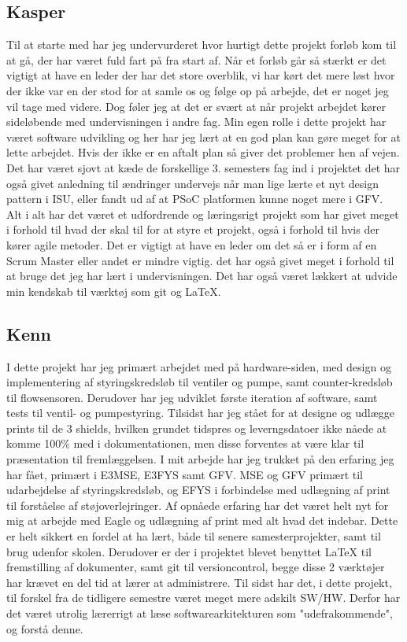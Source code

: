 \subsection{Kasper}
Til at starte med har jeg undervurderet hvor hurtigt dette projekt forløb kom til at gå, der har været fuld fart på fra start af. Når et forløb går så stærkt er det vigtigt at have en leder der har det store overblik, vi har kørt det mere løst hvor der ikke var en der stod for at samle os og følge op på arbejde, det er noget jeg vil tage med videre. Dog føler jeg at det er svært at når projekt arbejdet kører sideløbende med undervisningen i andre fag. Min egen rolle i dette projekt har været software udvikling og her har jeg lært at en god plan kan gøre meget for at lette arbejdet. Hvis der ikke er en aftalt plan så giver det problemer hen af vejen. Det har været sjovt at kæde de forskellige 3. semesters fag ind i projektet det har også givet anledning til ændringer undervejs når man lige lærte et nyt design pattern i ISU, eller fandt ud af at PSoC platformen kunne noget mere i GFV. \\
Alt i alt har det været et udfordrende og læringsrigt projekt som har givet meget i forhold til hvad der skal til for at styre et projekt, også i forhold til hvis der kører agile metoder. Det er vigtigt at have en leder om det så er i form af en Scrum Master eller andet er mindre vigtig. det har også givet meget i forhold til at bruge det jeg har lært i undervisningen. Det har også været lækkert at udvide min kendskab til værktøj som git og LaTeX.

\subsection{Kenn}
I dette projekt har jeg primært arbejdet med på hardware-siden, med design og implementering af styringskredsløb til ventiler og pumpe, samt counter-kredsløb til flowsensoren. Derudover har jeg udviklet første iteration af software, samt tests til ventil- og pumpestyring. Tilsidst har jeg stået for at designe og udlægge prints til de 3 shields, hvilken grundet tidspres og leverngsdatoer ikke nåede at komme 100\% med i dokumentationen, men disse forventes at være klar til præsentation til fremlæggelsen. I mit arbejde har jeg trukket på den erfaring jeg har fået, primært i E3MSE, E3FYS samt GFV. MSE og GFV primært til udarbejdelse af styringskredsløb, og EFYS i forbindelse med udlægning af print til forståelse af støjoverlejringer.\newline
Af opnåede erfaring har det været helt nyt for mig at arbejde med Eagle og udlægning af print med alt hvad det indebar. Dette er helt sikkert en fordel at ha lært, både til senere samesterprojekter, samt til brug udenfor skolen. Derudover er der i projektet blevet benyttet LaTeX til fremstilling af dokumenter, samt git til versioncontrol, begge disse 2 værktøjer har krævet en del tid at lærer at administrere. Til sidst har det, i dette projekt, til forskel fra de tidligere semestre været meget mere adskilt SW/HW. Derfor har det været utrolig lærerrigt at læse softwarearkitekturen som "udefrakommende", og forstå denne.

